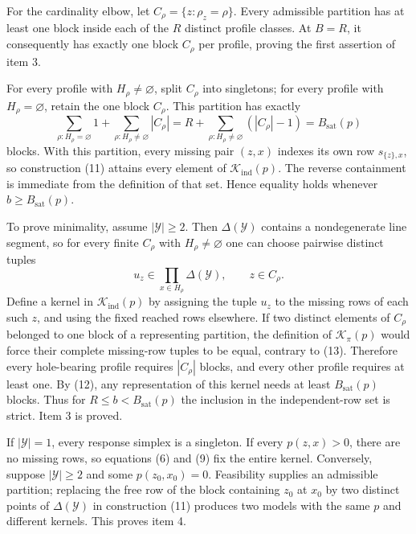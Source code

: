 For the cardinality elbow, let \(C_\rho=\{z:\rho_z=\rho\}\).  Every
admissible partition has at least one block inside each of the \(R\)
distinct profile classes.  At \(B=R\), it consequently has exactly one
block \(C_\rho\) per profile, proving the first assertion of item 3.

For every profile with \(H_\rho\ne\varnothing\), split \(C_\rho\) into
singletons; for every profile with \(H_\rho=\varnothing\), retain the one
block \(C_\rho\).  This partition has exactly
\[
 \sum_{\rho:H_\rho=\varnothing}1
 +\sum_{\rho:H_\rho\ne\varnothing}|C_\rho|
 =R+\sum_{\rho:H_\rho\ne\varnothing}(|C_\rho|-1)
 =B_{\mathrm{sat}}(p)
\tag{12}
\]
blocks.  With this partition, every missing pair \((z,x)\) indexes its own
row \(s_{\{z\},x}\), so construction (11) attains every element of
\(\mathcal K_{\mathrm{ind}}(p)\).  The reverse containment is immediate
from the definition of that set.  Hence equality holds whenever
\(b\geq B_{\mathrm{sat}}(p)\).

To prove minimality, assume \(|\mathcal Y|\geq2\).  Then
\(\Delta(\mathcal Y)\) contains a nondegenerate line segment, so for every
finite \(C_\rho\) with \(H_\rho\ne\varnothing\) one can choose pairwise
distinct tuples
\[
 u_z\in\prod_{x\in H_\rho}\Delta(\mathcal Y),
 \qquad z\in C_\rho.
\tag{13}
\]
Define a kernel in \(\mathcal K_{\mathrm{ind}}(p)\) by assigning the
tuple \(u_z\) to the missing rows of each such \(z\), and using the fixed
reached rows elsewhere.  If two distinct elements of \(C_\rho\) belonged
to one block of a representing partition, the definition of
\(\mathcal K_\pi(p)\) would force their complete missing-row tuples to be
equal, contrary to (13).  Therefore every hole-bearing profile requires
\(|C_\rho|\) blocks, and every other profile requires at least one.  By
(12), any representation of this kernel needs at least
\(B_{\mathrm{sat}}(p)\) blocks.  Thus for
\(R\leq b<B_{\mathrm{sat}}(p)\) the inclusion in the independent-row set
is strict.  Item 3 is proved.

If \(|\mathcal Y|=1\), every response simplex is a singleton.  If every
\(p(z,x)>0\), there are no missing rows, so equations (6) and (9) fix the
entire kernel.  Conversely, suppose \(|\mathcal Y|\geq2\) and some
\(p(z_0,x_0)=0\).  Feasibility supplies an admissible partition; replacing
the free row of the block containing \(z_0\) at \(x_0\) by two distinct
points of \(\Delta(\mathcal Y)\) in construction (11) produces two models
with the same \(p\) and different kernels.  This proves item 4.

